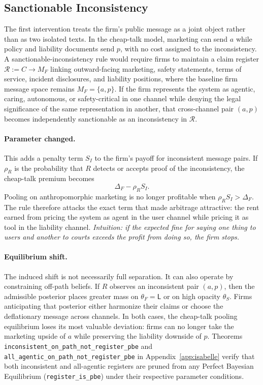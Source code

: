 \subsection{Sanctionable Inconsistency}
\label{subsec:sanctionable-inconsistency}

The first intervention treats the firm's public message as a joint object rather
than as two isolated texts. In the cheap-talk model, marketing can send $a$
while policy and liability documents send $p$, with no cost assigned to the
inconsistency. A sanctionable-inconsistency rule would require firms to maintain
a claim register $\mathcal{R} := C \to M_F$ linking outward-facing
marketing, safety statements, terms of service, incident disclosures, and
liability positions, where the baseline firm message space remains
$M_F=\{a,p\}$. If the firm represents the system as agentic, caring, autonomous,
or safety-critical in one channel while denying the legal significance of the
same representation in another, that cross-channel pair $(a,p)$ becomes
independently sanctionable as an inconsistency in $\mathcal{R}$.

\paragraph{Parameter changed.}
This adds a penalty term $S_I$ to the firm's payoff for inconsistent message
pairs. If $\rho_R$ is the probability that $R$ detects or accepts proof of the
inconsistency, the cheap-talk premium becomes
\[
\Delta_F-\rho_R S_I .
\]
Pooling on anthropomorphic marketing is no longer profitable when
$\rho_R S_I>\Delta_F$. The rule therefore attacks the exact term that made
arbitrage attractive: the rent earned from pricing the system as agent in the
user channel while pricing it as tool in the liability channel.
\emph{Intuition: if the expected fine for saying one thing to users and another to courts exceeds the profit from doing so, the firm stops.}

\paragraph{Equilibrium shift.}
The induced shift is not necessarily full separation. It can also operate by
constraining off-path beliefs. If $R$ observes an inconsistent pair $(a,p)$,
then the admissible posterior places greater mass on $\theta_F=\mathsf{L}$ or
on high opacity $\theta_S$. Firms anticipating that posterior either harmonize
their claims or choose the deflationary message across channels. In both cases,
the cheap-talk pooling equilibrium loses its most valuable deviation: firms can
no longer take the marketing upside of $a$ while preserving the liability
downside of $p$. Theorems \texttt{inconsistent\_\allowbreak{}on\_\allowbreak{}path\_\allowbreak{}not\_\allowbreak{}register\_\allowbreak{}pbe} and \texttt{all\_\allowbreak{}agentic\_\allowbreak{}on\_\allowbreak{}path\_\allowbreak{}not\_\allowbreak{}register\_\allowbreak{}pbe} in Appendix~\ref{app:isabelle} verify that both inconsistent and all-agentic registers are pruned from any Perfect Bayesian Equilibrium (\texttt{register\_\allowbreak{}is\_\allowbreak{}pbe}) under their respective parameter conditions.

